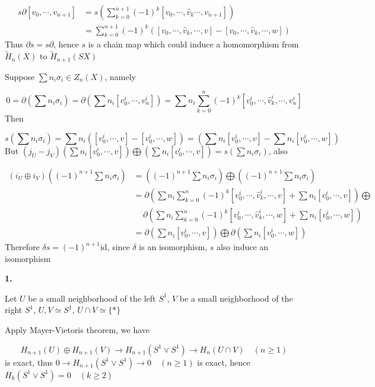 \documentclass[12pt]{article}
\begin{document}
\[
\begin{aligned}
s\partial[v_0,\cdots,v_{n+1}]
&=s\left(\sum_{k=0}^{n+1}(-1)^k[v_0,\cdots,\hat{v}_k\cdots,v_{n+1}]\right) \\
&=\sum_{k=0}^{n+1}(-1)^k\left([v_0,\cdots,\hat{v}_k,\cdots,v]-[v_0,\cdots,\hat{v}_k,\cdots,w]\right)
\end{aligned}
\]
Thus $\partial s=s\partial$, hence $s$ is a chain map which could induce a homomorphism from $\tilde{H}_n(X)$ to $\tilde{H}_{n+1}(SX)$ \par
Suppose $\sum n_i\sigma_i\in Z_{n}(X)$, namely \par
\[
0=\partial\left(\sum n_i\sigma_i\right)=\partial\left(\sum n_i[v^i_0,\cdots,v^i_n]\right)=\sum n_i\sum_{k=0}^n(-1)^k[v^i_0,\cdots,\hat{v}^i_k,\cdots,v^i_n]
\]
Then \par
$$s\left(\sum n_i\sigma_i\right)=\sum n_i\left([v^i_0,\cdots,v]-[v^i_0,\cdots,w]\right)=\left(\sum n_i[v^i_0,\cdots,v]-\sum n_i[v^i_0,\cdots,w]\right)$$
But $(j_U-j_V)\left(\sum n_i[v^i_0,\cdots,v]\right)\bigoplus\left(\sum n_i[v^i_0,\cdots,v]\right)=s\left(\sum n_i\sigma_i\right)$, also \par
\[
\begin{aligned}
(i_U\oplus i_V)\left((-1)^{n+1}\sum n_i\sigma_i\right)
&=\left((-1)^{n+1}\sum n_i\sigma_i\right)\bigoplus\left((-1)^{n+1}\sum n_i\sigma_i\right) \\
&=\partial\left(\sum n_i\sum_{k=0}^n(-1)^k[v^i_0,\cdots,\hat{v}^i_k,\cdots,v]+\sum n_i[v^i_0,\cdots,v]\right)\bigoplus \\
&\,\quad\partial\left(\sum n_i\sum_{k=0}^n(-1)^k[v^i_0,\cdots,\hat{v}^i_k,\cdots,w]+\sum n_i[v^i_0,\cdots,w]\right) \\
&=\partial\left(\sum n_i[v^i_0,\cdots,v]\right)\bigoplus\partial\left(\sum n_i[v^i_0,\cdots,w]\right)
\end{aligned}
\]
Therefore $\delta s=(-1)^{n+1}\mathrm{id}$, since $\delta$ is an isomorphism, $s$ also induce an isomorphism \par 
\textbf{1.} \par
Let $U$ be a small neighborhood of the left $S^1$, $V$ be a small neighborhood of the right $S^1$, $U,V\simeq S^1$, $U\cap V\simeq\{*\}$ \par
Apply Mayer-Vietoris theorem, we have \par
\[
H_{n+1}(U)\oplus H_{n+1}(V)\rightarrow H_{n+1}(S^1\vee S^1)\rightarrow H_n(U\cap V) \quad (n\geq 1)
\]
is exact, thus $0\rightarrow H_{n+1}(S^1\vee S^1)\rightarrow 0 \quad (n\geq 1)$ is exact, hence $H_k(S^1\vee S^1)=0 \quad (k\geq 2)$
\end{document}
